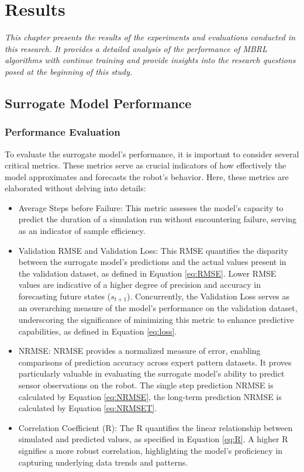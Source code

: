 \chapter{Results}
\label{chap5}
\textit{This chapter presents the results of the experiments and evaluations conducted in this research. It provides a detailed analysis of the performance of MBRL algorithms with continue training and provide insights into the research questions posed at the beginning of this study.}

\section{Surrogate Model Performance}
\subsection{Performance Evaluation}
To evaluate the surrogate model's performance, it is important to consider several critical metrics. These metrics serve as crucial indicators of how effectively the model approximates and forecasts the robot's behavior. Here, these metrics are elaborated without delving into details:
\begin{itemize}
    \item Average Steps before Failure: This metric assesses the model's capacity to predict the duration of a simulation run without encountering failure, serving as an indicator of sample efficiency.
    \item Validation RMSE and Validation Loss: This RMSE quantifies the disparity between the surrogate model's predictions and the actual values present in the validation dataset, as defined in Equation \ref{eq:RMSE}. Lower RMSE values are indicative of a higher degree of precision and accuracy in forecasting future states ($s_{t+1}$). Concurrently, the Validation Loss serves as an overarching measure of the model's performance on the validation dataset, underscoring the significance of minimizing this metric to enhance predictive capabilities, as defined in Equation \ref{eq:loss}.
    \item NRMSE: NRMSE provides a normalized measure of error, enabling comparisons of prediction accuracy across expert pattern datasets. It proves particularly valuable in evaluating the surrogate model's ability to predict sensor observations on the robot. The single step prediction NRMSE is calculated by Equation \ref{eq:NRMSE}, the long-term prediction NRMSE is calculated by Equation \ref{eq:NRMSET}.
    \item Correlation Coefficient (R): The R quantifies the linear relationship between simulated and predicted values, as specified in Equation \ref{eq:R}. A higher R signifies a more robust correlation, highlighting the model's proficiency in capturing underlying data trends and patterns.
\end{itemize}

